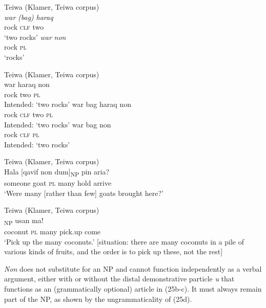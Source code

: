 \ea%
\label{ex:21}
Teiwa (Klamer, Teiwa corpus)\\
\ea
\gll \textit{war} \textit{(bag)} \textit{haraq}  \\
  rock \textsc{clf} two \\
\glt `two rocks'
\ex
\gll \textit{war} \textit{non}\\
  rock \textsc{pl}\\
 `rocks'
\z
\z


\ea%
\label{ex:22}
Teiwa (Klamer, Teiwa corpus)\\
\ea
\gll  *war haraq non \\
  rock two \textsc{pl}   \\
\glt Intended: `two rocks'
\ex
\gll *war bag haraq non \\
  rock \textsc{clf} two \textsc{pl}   \\
\glt  Intended: `two rocks'
\ex
\gll *war bag non \\
   rock \textsc{clf} \textsc{pl}  \\
\glt Intended: `two rocks'
\z
\z





\ea%
\label{ex:23}
Teiwa (Klamer, Teiwa corpus)\\
\gll Hala [{qavif} non {dum}]\textsubscript{NP} pin aria{{\textglotstop}}{?} \\
  someone goat \textsc{pl} many hold arrive   \\
\glt `Were many [rather than few] goats brought here?'
\z







\ea%
\label{ex:24}
Teiwa (Klamer, Teiwa corpus)\\
\textsubscript{NP} usan ma! \\
  coconut \textsc{pl} many pick.up come  \\
\glt `Pick up the many coconuts.' [situation: there are many coconuts in a pile of various kinds of fruits, and the order is to pick up these, not the rest]
\z






\textit{Non} does not substitute for an NP and cannot function independently as a verbal argument, either with or without the distal demonstrative particle \textit{u} that functions as an (grammatically optional) article in (25b-c). It must always remain part of the NP, as shown by the ungrammaticality of (25d).


